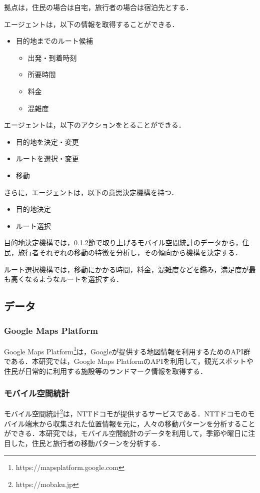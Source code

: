 拠点は，住民の場合は自宅，旅行者の場合は宿泊先とする．

エージェントは，以下の情報を取得することができる．
\begin{itemize}
  \item 目的地までのルート候補
    \begin{itemize}
      \item 出発・到着時刻
      \item 所要時間
      \item 料金
      \item 混雑度
    \end{itemize}
\end{itemize}

エージェントは，以下のアクションをとることができる．
\begin{itemize}
  \item 目的地を決定・変更
  \item ルートを選択・変更
  \item 移動
\end{itemize}

さらに，エージェントは，以下の意思決定機構を持つ．
\begin{itemize}
  \item 目的地決定
  \item ルート選択
\end{itemize}

目的地決定機構では，\ref{section_mobaku}節で取り上げるモバイル空間統計のデータから，住民，旅行者それぞれの移動の特徴を分析し，その傾向から機構を決定する．

ルート選択機構では，移動にかかる時間，料金，混雑度などを鑑み，満足度が最も高くなるようなルートを選択する．

\subsection{データ}
\subsubsection{Google Maps Platform}
Google Maps Platform\footnote{https://mapsplatform.google.com}は，Googleが提供する地図情報を利用するためのAPI群である．本研究では，Google Maps PlatformのAPIを利用して，観光スポットや住民が日常的に利用する施設等のランドマーク情報を取得する．

\subsubsection{モバイル空間統計}
\label{section_mobaku}
モバイル空間統計\footnote{https://mobaku.jp}は，NTTドコモが提供するサービスである．NTTドコモのモバイル端末から収集された位置情報を元に，人々の移動パターンを分析することができる．本研究では，モバイル空間統計のデータを利用して，季節や曜日に注目した，住民と旅行者の移動パターンを分析する．

